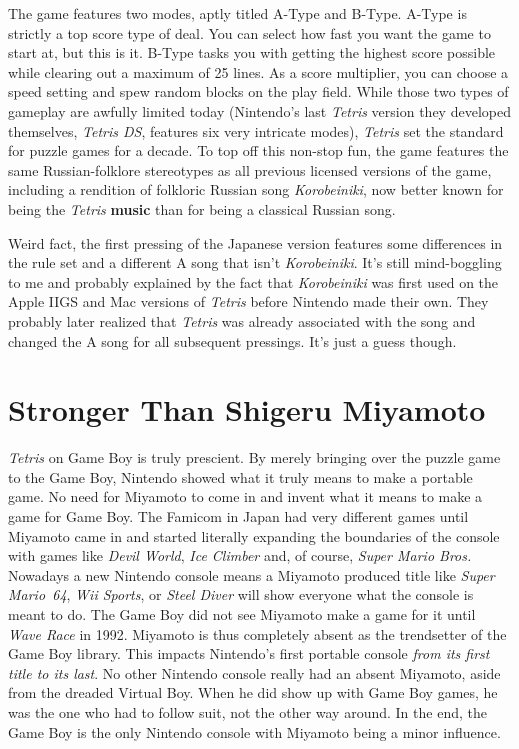 \documentclass{book}
\begin{document}
The game features two modes, aptly titled A-Type and B-Type. A-Type is strictly a top score type of deal. You can select how fast you want the game to start at, but this is it. B-Type tasks you with getting the highest score possible while clearing out a maximum of 25 lines. As a score multiplier, you can choose a speed setting and spew random blocks on the play field. While those two types of gameplay are awfully limited today (Nintendo’s last \emph{Tetris} version they developed themselves, \emph{Tetris DS}, features six very intricate modes), \emph{Tetris} set the standard for puzzle games for a decade. To top off this non-stop fun, the game features the same Russian-folklore stereotypes as all previous licensed versions of the game, including a rendition of folkloric Russian song \emph{Korobeiniki}, now better known for being the \emph{Tetris} \textbf{music} than for being a classical Russian song.

Weird fact, the first pressing of the Japanese version features some differences in the rule set and a different A song that isn’t \emph{Korobeiniki}. It’s still mind-boggling to me and probably explained by the fact that \emph{Korobeiniki} was first used on the Apple IIGS and Mac versions of \emph{Tetris} before Nintendo made their own. They probably later realized that \emph{Tetris} was already associated with the song and changed the A song for all subsequent pressings. It’s just a guess though.

\FloatBarrier\needspace{5pt}\section*{Stronger Than Shigeru Miyamoto}\nopagebreak[4]

\emph{Tetris} on Game Boy is truly prescient. By merely bringing over the puzzle game to the Game Boy, Nintendo showed what it truly means to make a portable game. No need for Miyamoto to come in and invent what it means to make a game for Game Boy. The Famicom in Japan had very different games until Miyamoto came in and started literally expanding the boundaries of the console with games like \emph{Devil World}, \emph{Ice Climber} and, of course, \emph{Super Mario Bros.} Nowadays a new Nintendo console means a Miyamoto produced title like \emph{Super Mario 64}, \emph{Wii Sports}, or \emph{Steel Diver} will show everyone what the console is meant to do. The Game Boy did not see Miyamoto make a game for it until \emph{Wave Race} in 1992. Miyamoto is thus completely absent as the trendsetter of the Game Boy library. This impacts Nintendo’s first portable console \emph{from its first title to its last}. No other Nintendo console really had an absent Miyamoto, aside from the dreaded Virtual Boy. When he did show up with Game Boy games, he was the one who had to follow suit, not the other way around. In the end, the Game Boy is the only Nintendo console with Miyamoto being a minor influence.
\end{document}
